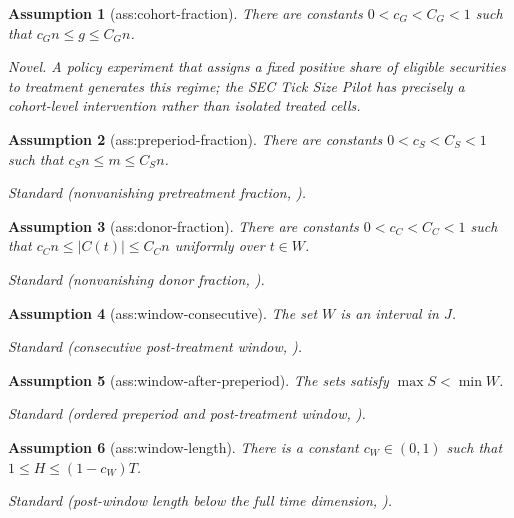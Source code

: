 \documentclass{article}
\newtheorem{assumption}{Assumption}
\begin{document}
\begin{assumption}[ass:cohort-fraction]\label{ass:cohort-fraction}
There are constants \(0<c_G<C_G<1\) such that \(c_Gn\le g\le C_Gn\).
\par\smallskip\noindent\emph{Novel.} A policy experiment that assigns a fixed positive share of eligible securities to treatment generates this regime; the SEC Tick Size Pilot has precisely a cohort-level intervention rather than isolated treated cells.
\end{assumption}

\begin{assumption}[ass:preperiod-fraction]\label{ass:preperiod-fraction}
There are constants \(0<c_S<C_S<1\) such that \(c_Sn\le m\le C_Sn\).
\par\smallskip\noindent\emph{Standard} (nonvanishing pretreatment fraction, \cite{choiYuan2024MNAR}).
\end{assumption}

\begin{assumption}[ass:donor-fraction]\label{ass:donor-fraction}
There are constants \(0<c_C<C_C<1\) such that \(c_Cn\le |C(t)|\le C_Cn\) uniformly over \(t\in W\).
\par\smallskip\noindent\emph{Standard} (nonvanishing donor fraction, \cite{choiYuan2024MNAR}).
\end{assumption}

\begin{assumption}[ass:window-consecutive]\label{ass:window-consecutive}
The set \(W\) is an interval in \(J\).
\par\smallskip\noindent\emph{Standard} (consecutive post-treatment window, \cite{choiYuan2024MNAR}).
\end{assumption}

\begin{assumption}[ass:window-after-preperiod]\label{ass:window-after-preperiod}
The sets satisfy \(\max S<\min W\).
\par\smallskip\noindent\emph{Standard} (ordered preperiod and post-treatment window, \cite{choiYuan2024MNAR}).
\end{assumption}

\begin{assumption}[ass:window-length]\label{ass:window-length}
There is a constant \(c_W\in(0,1)\) such that \(1\le H\le(1-c_W)T\).
\par\smallskip\noindent\emph{Standard} (post-window length below the full time dimension, \cite{choiYuan2024MNAR}).
\end{assumption}
\end{document}
